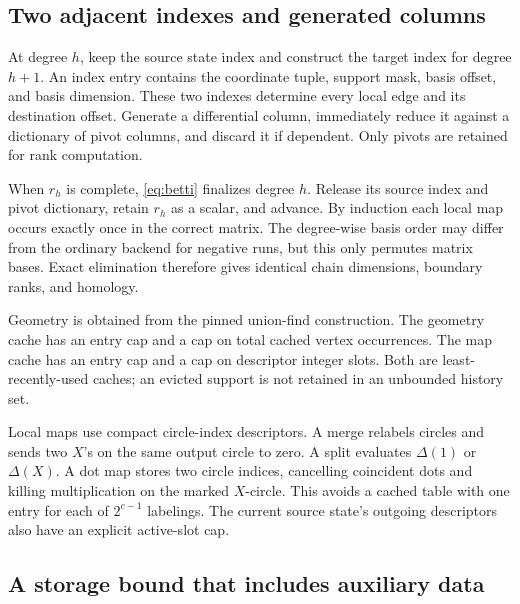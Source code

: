\subsection{Two adjacent indexes and generated columns}

At degree \(h\), keep the source state index and construct the target
index for degree \(h+1\). An index entry contains the coordinate tuple,
support mask, basis offset, and basis dimension. These two indexes
determine every local edge and its destination offset.
Generate a differential column, immediately reduce it against a
dictionary of pivot columns, and discard it if dependent.
Only pivots are retained for rank computation.

When \(r_h\) is complete, \eqref{eq:betti} finalizes degree \(h\).
Release its source index and pivot dictionary, retain \(r_h\) as a
scalar, and advance. By induction each local map occurs exactly once
in the correct matrix. The degree-wise basis order may differ from the
ordinary backend for negative runs, but this only permutes matrix bases.
Exact elimination therefore gives identical chain dimensions, boundary
ranks, and homology.

Geometry is obtained from the pinned union-find construction.
The geometry cache has an entry cap and a cap on total cached vertex
occurrences. The map cache has an entry cap and a cap on descriptor
integer slots. Both are least-recently-used caches; an evicted support
is not retained in an unbounded history set.

Local maps use compact circle-index descriptors. A merge relabels circles
and sends two \(X\)'s on the same output circle to zero. A split evaluates
\(\Delta(1)\) or \(\Delta(X)\). A dot map stores two circle indices,
cancelling coincident dots and killing multiplication on the marked
\(X\)-circle. This avoids a cached table with one entry for each of
\(2^{c-1}\) labelings. The current source state's outgoing descriptors
also have an explicit active-slot cap.

\subsection{A storage bound that includes auxiliary data}


